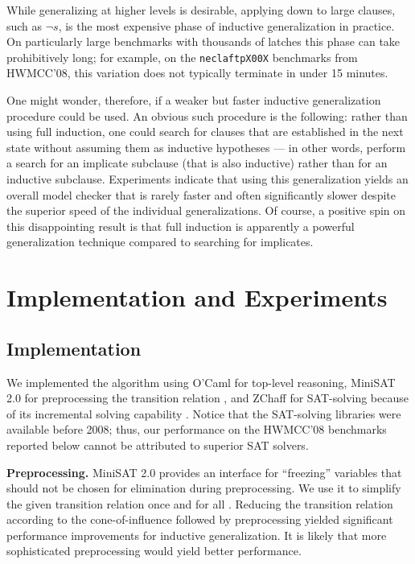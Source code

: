 \documentclass{llncs}
\newcommand{\bnot}{\neg}
\begin{document}
While generalizing at higher levels is desirable, applying {\sf down}
to large clauses, such as $\bnot s$, is the most expensive phase of
inductive generalization in practice.  On particularly large
benchmarks with thousands of latches this phase can take prohibitively
long; for example, on the {\tt neclaftpX00X} benchmarks from HWMCC'08,
this variation does not typically terminate in under 15 minutes.

One might wonder, therefore, if a weaker but faster inductive
generalization procedure could be used.  An obvious such procedure is
the following: rather than using full induction, one could search for
clauses that are established in the next state without assuming them
as inductive hypotheses --- in other words, perform a search for an
implicate subclause (that is also inductive) rather than for an
inductive subclause.  Experiments indicate that using this
generalization yields an overall model checker that is rarely faster
and often significantly slower despite the superior speed of the
individual generalizations.  Of course, a positive spin on this
disappointing result is that full induction is apparently a powerful
generalization technique compared to searching for implicates.

\section{Implementation and Experiments}
\label{sec:exp}

\subsection{Implementation}

We implemented the algorithm using O'Caml for top-level reasoning,
MiniSAT 2.0 for preprocessing the transition relation
\cite{Een+Biere/2005}, and ZChaff for SAT-solving because of its
incremental solving capability \cite{Moskewicz+Others/2001}.  Notice
that the SAT-solving libraries were available before 2008; thus, our
performance on the HWMCC'08 benchmarks reported below cannot be
attributed to superior SAT solvers.

{\bf Preprocessing.}  MiniSAT 2.0 provides an interface for
``freezing'' variables that should not be chosen for elimination
during preprocessing.  We use it to simplify the given transition
relation once and for all \cite{Een+Others/2007}.  Reducing the
transition relation according to the cone-of-influence
\cite{Clarke+Others:MC:2000} followed by preprocessing yielded
significant performance improvements for inductive generalization.  It
is likely that more sophisticated preprocessing would yield better
performance.
\end{document}
